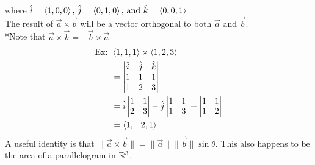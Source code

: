 \documentclass[11pt, fleqn]{article}
\begin{document}
where $\hat{i}=\left\langle 1,0,0 \right\rangle,\,\hat{j}=\left\langle 0,1,0 \right\rangle,\,\text{and }\hat{k}=\left\langle 0,0,1 \right\rangle$\\
The result of $\vec{a}\times\vec{b}$ will be a vector orthogonal to both $\vec{a}$ and $\vec{b}$.\\
*Note that $\vec{a}\times\vec{b}=-\vec{b}\times\vec{a}$
\begin{align*}
    \text{Ex: }&\left\langle 1,1,1 \right\rangle\times\left\langle 1,2,3 \right\rangle\\
    &=\left|\begin{matrix} \hat{i} & \hat{j} & \hat{k}\\1 & 1 & 1\\1&2&3 \end{matrix}\right|\\
    &=\hat{i}\left|\begin{matrix} 1&1\\2&3 \end{matrix}\right|-\hat{j}\left|\begin{matrix} 1&1\\1&3 \end{matrix}\right|+\left|\begin{matrix} 1&1\\1&2 \end{matrix}\right|\\
    &=\left\langle 1,-2,1 \right\rangle
\end{align*}
A useful identity is that $\|\vec{a}\times\vec{b}\|=\|\vec{a}\|\|\vec{b}\|\sin\theta$. This also happens to be the area of a parallelogram in $\mathbb{R}^3$.
\end{document}
